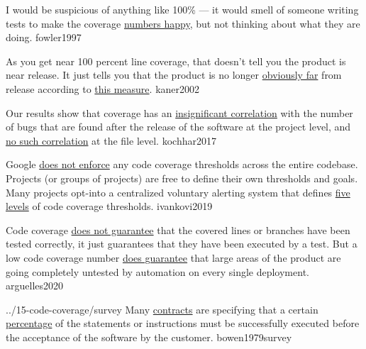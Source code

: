 \documentclass{article}
\begin{document}
  {I would be suspicious of anything like 100\% --- it would smell of someone writing tests to make the coverage \ul{numbers happy}, but not thinking about what they are doing.}
  {fowler1997}

  {As you get near 100 percent line coverage, that doesn't tell you the product is near release. It just tells you that the product is no longer \ul{obviously far} from release according to \ul{this measure}.}
  {kaner2002}

  {Our results show that coverage has an \ul{insignificant correlation} with the number of bugs that are found after the release of the software at the project level, and \ul{no such correlation} at the file level.}
  {kochhar2017}

  {Google \ul{does not enforce} any code coverage thresholds across the entire codebase. Projects (or groups of projects) are free to define their own thresholds and goals. Many projects opt-into a centralized voluntary alerting system that defines \ul{five levels} of code coverage thresholds.}
  {ivankovi2019}


  {Code coverage \ul{does not guarantee} that the covered lines or branches have been tested correctly, it just guarantees that they have been executed by a test. But a low code coverage number \ul{does guarantee} that large areas of the product are going completely untested by automation on every single deployment.}
  {arguelles2020}

\lnQuote
  {../15-code-coverage/survey}
  {Many \ul{contracts} are specifying that a certain \ul{percentage} of the statements or instructions must be successfully executed before the acceptance of the software by the customer.}
  {bowen1979survey}
\end{document}
